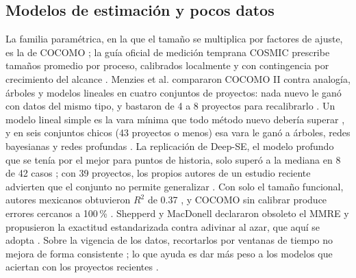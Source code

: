 \documentclass[10pt,twocolumn]{article}
\begin{document}
\subsection{Modelos de estimación y pocos datos}
La familia paramétrica, en la que el tamaño se multiplica por factores de ajuste, es la de COCOMO \cite{boehm1981}; la guía oficial de medición temprana COSMIC prescribe tamaños promedio por proceso, calibrados localmente y con contingencia por crecimiento del alcance \cite{cosmic2020medicion}. Menzies et al. compararon COCOMO II contra analogía, árboles y modelos lineales en cuatro conjuntos de proyectos: nada nuevo le ganó con datos del mismo tipo, y bastaron de 4 a 8 proyectos para recalibrarlo \cite{menzies2017negative}. Un modelo lineal simple es la vara mínima que todo método nuevo debería superar \cite{whigham2015baseline}, y en seis conjuntos chicos (43 proyectos o menos) esa vara le ganó a árboles, redes bayesianas y redes profundas \cite{abedu2021machine}. La replicación de Deep-SE, el modelo profundo que se tenía por el mejor para puntos de historia, solo superó a la mediana en 8 de 42 casos \cite{tawosi2023agile}; con 39 proyectos, los propios autores de un estudio reciente advierten que el conjunto no permite generalizar \cite{ozcelik2026effort}. Con solo el tamaño funcional, autores mexicanos obtuvieron $R^2$ de 0.37 \cite{martinez2019estimacion}, y COCOMO sin calibrar produce errores cercanos a 100\,\% \cite{jeklin2025evaluation}. Shepperd y MacDonell declararon obsoleto el MMRE y propusieron la exactitud estandarizada contra adivinar al azar, que aquí se adopta \cite{shepperd2012evaluating}. Sobre la vigencia de los datos, recortarlos por ventanas de tiempo no mejora de forma consistente \cite{lokan2014investigating,bosu2020analyzing}; lo que ayuda es dar más peso a los modelos que aciertan con los proyectos recientes \cite{minku2017which}.
\end{document}
